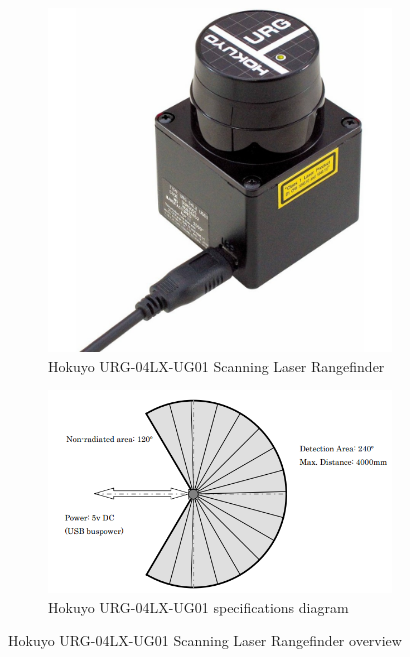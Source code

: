 \begin{figure}[ht!]
  \centering
  \begin{subfigure}[t]{0.35\linewidth}
    \includegraphics[width=\linewidth]{imgs/chapter4/lidar.jpg}
     \caption{Hokuyo URG-04LX-UG01 Scanning Laser Rangefinder}
     \label{fig:lidarP}
  \end{subfigure}
  \begin{subfigure}[t]{0.55\linewidth}
    \includegraphics[width=\linewidth]{imgs/chapter4/lidarS.png}
    \caption{Hokuyo URG-04LX-UG01 specifications diagram}
    \label{fig::lidarS}
  \end{subfigure}
  \caption{Hokuyo URG-04LX-UG01 Scanning Laser Rangefinder overview }
  \label{fig:lidar}
\end{figure}


